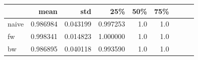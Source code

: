 \documentclass[10pt,conference,compsocconf,a4paper]{IEEEtran}
\newcommand{\nunit}[1]{\ \si{#1}}
\newcommand*{\shortautoref}[1]{%
	\begingroup
	\def\equationautorefname{\textsc{Eq.}}%
	\def\tableautorefname{\textsc{Tab.}}%
	\def\figureautorefname{\textsc{Fig.}}%
	\autoref{#1}%
	\endgroup
}
\begin{document}


		\begin{table}
			\centering
			\begin{tabular}{lrrrrrrrr}
			\toprule
			{} &             mean &       std &      25\% &  50\% &  75\% \\
			\midrule
			naive         &  0.986984 &  0.043199 &  0.997253 &  1.0 &  1.0 \\
			fw            &  0.998341 &  0.014823 &  1.000000 &  1.0 &  1.0 \\
			bw            &  0.986895 &  0.040118 &  0.993590 &  1.0 &  1.0 \\

\end{tabular}
\end{table}
\end{document}
